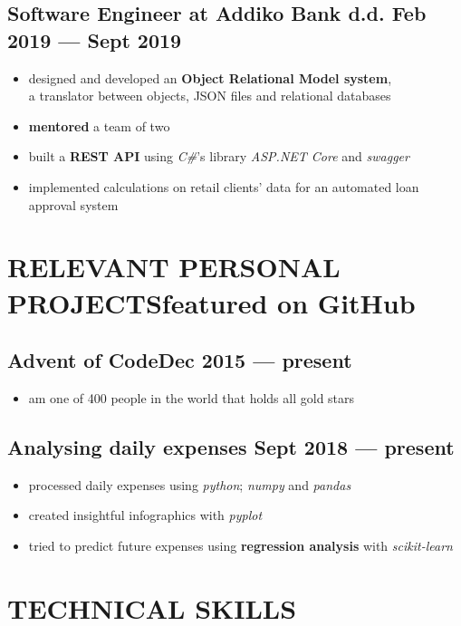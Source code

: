 \documentclass{article}
\begin{document}
\subsection{Software Engineer at Addiko Bank d.d. \hfill Feb 2019 --- Sept 2019}
\begin{itemize}
        \itemsep0em
        \item designed and developed an {\bfseries Object Relational Model system},
        \\a translator between objects, JSON files and relational databases
        \item {\bfseries mentored} a team of two
        \item built a {\bfseries REST API} using \textit{C\#}'s library \textit{ASP.NET Core} and \textit{swagger}
        \item implemented calculations on retail clients' data for an automated loan approval system
\end{itemize}

\section{RELEVANT PERSONAL PROJECTS\hfill featured on GitHub}
\subsection{Advent of Code\hfill Dec 2015 --- present}
\begin{itemize}
        \itemsep0em
        \item am one of 400 people in the world that holds all gold stars
\end{itemize}

\subsection{Analysing daily expenses \hfill Sept 2018 --- present}
\begin{itemize}
        \itemsep0em
        \item processed daily expenses using \textit{python}; \textit{numpy} and \textit{pandas}
        \item created insightful infographics with \textit{pyplot}
        \item tried to predict future expenses using {\bfseries regression analysis} with \textit{scikit-learn}
\end{itemize}

\section{TECHNICAL SKILLS}
\end{document}

